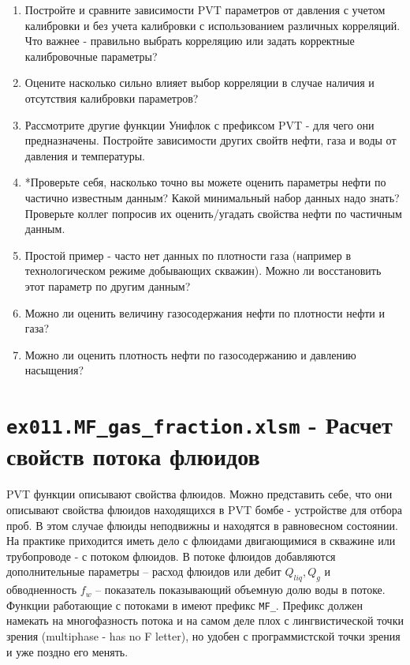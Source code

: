 \begin{enumerate}
	
	\item Постройте и сравните зависимости PVT параметров от давления с учетом калибровки и без учета калибровки с использованием различных корреляций. Что важнее - правильно выбрать корреляцию или задать корректные калибровочные параметры?
	
	\item Оцените насколько сильно влияет выбор корреляции в случае наличия и отсутствия калибровки параметров?
	
	\item Рассмотрите другие функции Унифлок с префиксом PVT - для чего они предназначены. Постройте зависимости других свойтв нефти, газа и воды от давления и температуры. 
	
	\item *Проверьте себя, насколько точно вы можете оценить параметры нефти по частично известным данным? Какой минимальный набор данных надо знать? Проверьте коллег попросив их оценить/угадать свойства нефти по частичным данным. 
	
	\item Простой пример - часто нет данных по плотности газа (например в технологическом режиме добывающих скважин). Можно ли восстановить этот параметр по другим данным?
	
	\item Можно ли оценить величину газосодержания нефти по плотности нефти и газа?
	
	\item Можно ли оценить плотность нефти по газосодержанию и давлению насыщения?
	
\end{enumerate}


\section{\texttt{ex011.MF\_gas\_fraction.xlsm} - Расчет свойств потока флюидов}

PVT функции описывают свойства флюидов. Можно представить себе, что они описывают свойства флюидов находящихся в PVT бомбе - устройстве для отбора проб. В этом случае флюиды неподвижны и находятся в равновесном состоянии. На практике приходится иметь дело с флюидами двигающимися в скважине или трубопроводе - с потоком флюидов. В потоке флюидов добавляются дополнительные параметры -- расход флюидов или дебит $Q_{liq}, Q_g$ и обводненность $f_w$ -- показатель показывающий объемную долю воды в потоке. 
Функции работающие с потоками в \unf{} имеют префикс \texttt{MF_}. Префикс должен намекать на многофазность потока и на самом деле плох с лингвистической точки зрения (multiphase - has no F letter), но удобен с программистской точки зрения и уже поздно его менять.

